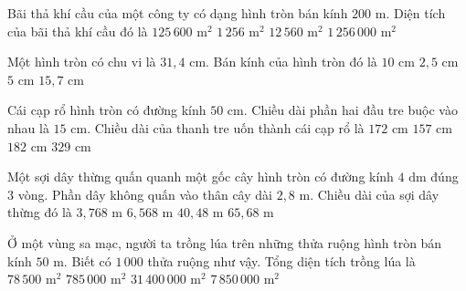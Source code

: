 \begin{ex} %
Bãi thả khí cầu của một công ty có dạng hình tròn bán kính $200\text{ m}$. Diện tích của bãi thả khí cầu đó là
\choice
{\True $125\,600\text{ m}^2$}
{$1\,256\text{ m}^2$}
{$12\,560\text{ m}^2$}
{$1\,256\,000\text{ m}^2$}
\end{ex}

\begin{ex} %
Một hình tròn có chu vi là $31{,}4\text{ cm}$. Bán kính của hình tròn đó là
\choice
{$10\text{ cm}$}
{$2{,}5\text{ cm}$}
{\True $5\text{ cm}$}
{$15{,}7\text{ cm}$}
\end{ex}

\begin{ex} %
Cái cạp rổ hình tròn có đường kính $50\text{ cm}$. Chiều dài phần hai đầu tre buộc vào nhau là $15\text{ cm}$. Chiều dài của thanh tre uốn thành cái cạp rổ là
\choice
{\True $172\text{ cm}$}
{$157\text{ cm}$}
{$182\text{ cm}$}
{$329\text{ cm}$}
\end{ex}

\begin{ex} %
Một sợi dây thừng quấn quanh một gốc cây hình tròn có đường kính $4\text{ dm}$ đúng $3$ vòng. Phần dây không quấn vào thân cây dài $2{,}8\text{ m}$. Chiều dài của sợi dây thừng đó là
\choice
{$3{,}768\text{ m}$}
{\True $6{,}568\text{ m}$}
{$40{,}48\text{ m}$}
{$65{,}68\text{ m}$}
\end{ex}

\begin{ex} %
Ở một vùng sa mạc, người ta trồng lúa trên những thửa ruộng hình tròn bán kính $50\text{ m}$. Biết có $1\,000$ thửa ruộng như vậy. Tổng diện tích trồng lúa là
\choice
{$78\,500\text{ m}^2$}
{$785\,000\text{ m}^2$}
{$31\,400\,000\text{ m}^2$}
{\True $7\,850\,000\text{ m}^2$}
\end{ex}

